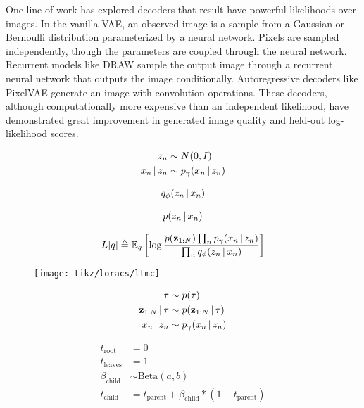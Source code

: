 One line of work has explored
decoders that result have powerful
likelihoods over images.
In the vanilla VAE, an observed image
is a sample 
from a Gaussian 
or Bernoulli distribution
parameterized by a neural network.
Pixels are sampled independently,
though the parameters are coupled
through the neural network.
Recurrent models like 
DRAW \citep{Gregor2015}
sample the output image
through a recurrent
neural network that outputs
the image conditionally.
Autoregressive decoders
like PixelVAE \citep{Gulrajani2016}
generate an image with convolution
operations.
These decoders, although
computationally more
expensive than an independent likelihood,
have demonstrated great improvement in
generated image quality and 
held-out log-likelihood scores.

\iffalse

\begin{align*}
    z_n &\sim N(0, I) \\
    x_n \,|\, z_n &\sim p_\gamma(x_n \,|\, z_n)
\end{align*}

\begin{align*}
  q_\phi(z_n \,|\, x_n)
\end{align*}

\begin{align*}
  p(z_n \,|\, x_n)
\end{align*}

\begin{align*}
  L[q] \triangleq \mathbb{E}_q\left[\log \frac{p(\mathbf{z}_{1:N})\prod_n p_\gamma(x_n \,|\, z_n)}{\prod_n q_\phi(z_n \,|\, x_n)}\right]
\end{align*}

\begin{figure}
    \texttt{[image: tikz/loracs/ltmc]}
\end{figure}

\begin{align*}
    \tau &\sim p(\tau) \\
    \mathbf{z}_{1:N} \,|\, \tau &\sim p(\mathbf{z}_{1:N} \,|\, \tau) \\
    x_n \,|\, z_n &\sim p_\gamma(x_n \,|\, z_n)
\end{align*}

\begin{align*}
    t_{\textrm{root}} &= 0 \\
    t_{\textrm{leaves}} &= 1 \\
    \beta_{\textrm{child}} &\sim \textrm{Beta}(a, b)\\
    t_{\textrm{child}} &= t_{\textrm{parent}} + \beta_{\textrm{child}} * (1 - t_{\textrm{parent}})
\end{align*}

